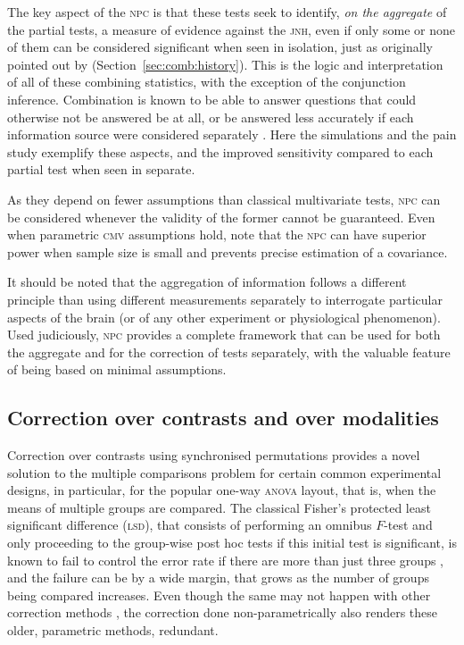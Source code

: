 The key aspect of the \textsc{npc} is that these tests seek to identify, \emph{on the aggregate} of the partial tests, a measure of evidence against the \textsc{jnh}, even if only some or none of them can be considered significant when seen in isolation, just as originally pointed out by \citet{Fisher1932} (Section~\ref{sec:comb:history}). This is the logic and interpretation of all of these combining statistics, with the exception of the conjunction inference. Combination is known to be able to answer questions that could otherwise not be answered be at all, or be answered less accurately if each information source were considered separately \citep{Draper1992}. Here the simulations and the pain study exemplify these aspects, and the improved sensitivity compared to each partial test when seen in separate.

As they depend on fewer assumptions than classical multivariate tests, \textsc{npc} can be considered whenever the validity of the former cannot be guaranteed. Even when parametric \textsc{cmv} assumptions hold, note that the \textsc{npc} can have superior power when sample size is small and prevents precise estimation of a covariance.

It should be noted that the aggregation of information follows a different principle than using different measurements separately to interrogate particular aspects of the brain (or of any other experiment or physiological phenomenon). Used judiciously, \textsc{npc} provides a complete framework that can be used for both the aggregate and for the correction of tests separately, with the valuable feature of being based on minimal assumptions.

\subsection{Correction over contrasts and over modalities}

Correction over contrasts using synchronised permutations provides a novel solution to the multiple comparisons problem for certain common experimental designs, in particular, for the popular one-way \textsc{anova} layout, that is, when the means of multiple groups are compared. The classical Fisher's protected least significant difference (\textsc{lsd}), that consists of performing an omnibus $F$-test and only proceeding to the group-wise post hoc tests if this initial test is significant, is known to fail to control the error rate if there are more than just three groups \citep{Hayter1986, Hsu1996, Meier2006}, and the failure can be by a wide margin, that grows as the number of groups being compared increases. Even though the same may not happen with other correction methods \citep[e.g., Tukey's range test,][]{Tukey1949}, the correction done non-parametrically also renders these older, parametric methods, redundant.

